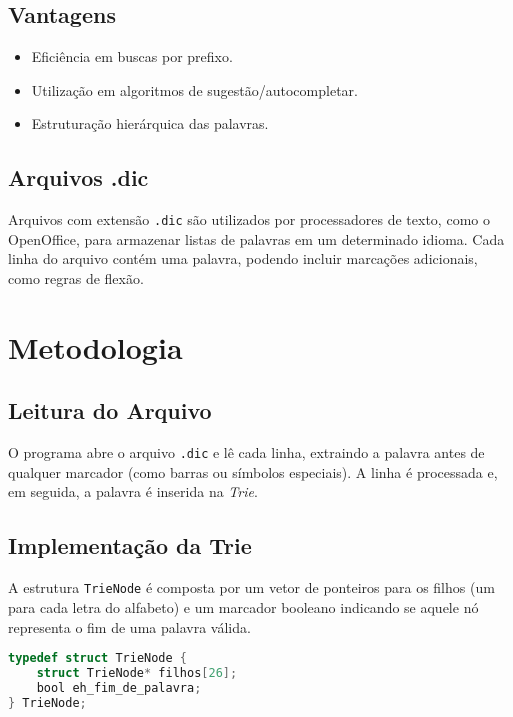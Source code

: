 \documentclass[12pt]{article}
\begin{document}
\subsection{Vantagens}

\begin{itemize}
    \item Eficiência em buscas por prefixo.
    \item Utilização em algoritmos de sugestão/autocompletar.
    \item Estruturação hierárquica das palavras.
\end{itemize}

\subsection{Arquivos .dic}

Arquivos com extensão \texttt{.dic} são utilizados por processadores de texto, como o OpenOffice, para armazenar listas de palavras em um determinado idioma. Cada linha do arquivo contém uma palavra, podendo incluir marcações adicionais, como regras de flexão.

\section{Metodologia}

\subsection{Leitura do Arquivo}

O programa abre o arquivo \texttt{.dic} e lê cada linha, extraindo a palavra antes de qualquer marcador (como barras ou símbolos especiais). A linha é processada e, em seguida, a palavra é inserida na \textit{Trie}.

\subsection{Implementação da Trie}

A estrutura \texttt{TrieNode} é composta por um vetor de ponteiros para os filhos (um para cada letra do alfabeto) e um marcador booleano indicando se aquele nó representa o fim de uma palavra válida.

\begin{lstlisting}[language=C, caption=Definição da estrutura TrieNode]
typedef struct TrieNode {
    struct TrieNode* filhos[26];
    bool eh_fim_de_palavra;
} TrieNode;
\end{lstlisting}
\end{document}
